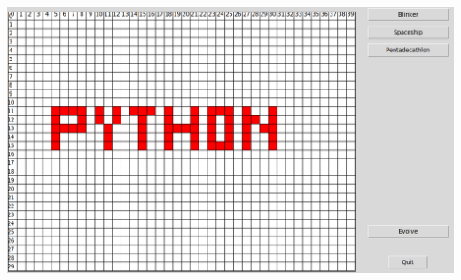 \documentclass[11pt,class=report,crop=false]{standalone}
\begin{document}
\begin{activite}[Iterations]
\begin{enumerate}
\begin{center}
\includegraphics[scale=\myscale,scale=0.3]{screen-life-4b-en}
\end{center}

    
\end{enumerate}
\end{activite} 
\end{document}
